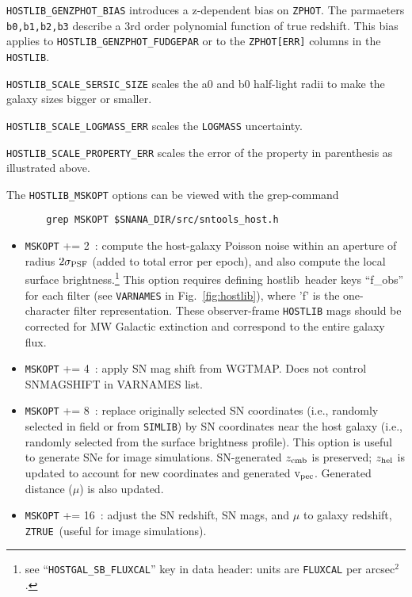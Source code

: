 \documentclass[12pt]{article}
\newcommand{\unc}{uncertainty}
\newcommand{\hostlib}{{\sc hostlib}}
\newcommand{\zhelio}{z_{\rm hel}}
\newcommand{\zcmb}{z_{\rm cmb}}
\newcommand{\vpec}{{\rm v}_{\rm pec}}
\newcommand{\ztrue}{{\tt ZTRUE}}
\begin{document}
{{\tt HOSTLIB\_GENZPHOT\_BIAS} introduces a z-dependent bias on {\tt ZPHOT}.
The parmaeters {\tt b0,b1,b2,b3} describe a 3rd order polynomial function
of true redshift. This bias applies to {\tt HOSTLIB\_GENZPHOT\_FUDGEPAR} 
or to the {\tt ZPHOT[ERR]} columns in the {\tt HOSTLIB}.

{\tt HOSTLIB\_SCALE\_SERSIC\_SIZE} scales the a0 and b0 half-light radii
to make the galaxy sizes bigger or smaller.

{\tt HOSTLIB\_SCALE\_LOGMASS\_ERR} scales the {\tt LOGMASS} \unc.

{\tt HOSTLIB\_SCALE\_PROPERTY\_ERR} scales the error of the property in parenthesis as illustrated above.

The {\tt HOSTLIB\_MSKOPT} options can be 
viewed with the grep-command
\begin{verbatim}
       grep MSKOPT $SNANA_DIR/src/sntools_host.h 
\end{verbatim}
%
\begin{itemize}
\item {\tt MSKOPT} += 2~: compute the host-galaxy Poisson noise within
       an aperture of radius $2\sigma_{\rm PSF}$ 
       (added to total error per epoch), and also compute
       the local surface brightness.\footnote{see 
         ``{\tt HOSTGAL\_SB\_FLUXCAL}'' key in data header: 
         units are {\tt FLUXCAL} per arcsec$^2$.}
       This option requires defining \hostlib\ header keys
       ``f\_obs'' for each filter 
       (see {\tt VARNAMES} in Fig.~\ref{fig:hostlib}), 
       where 'f' is the one-character filter representation.
       These observer-frame {\tt HOSTLIB} mags should be corrected for 
       MW Galactic extinction and correspond to the entire galaxy flux.
%
\item {\tt MSKOPT} += 4~: apply SN mag shift from WGTMAP.
      Does not control SNMAGSHIFT in VARNAMES list.
%
\item {\tt MSKOPT} += 8~: replace originally selected SN coordinates 
      (i.e., randomly selected in field or from {\tt SIMLIB})
      by SN coordinates near the host galaxy 
      (i.e., randomly selected from the surface brightness profile).
      This option is useful to generate SNe for image simulations.
      SN-generated $\zcmb$ is preserved; $\zhelio$ is updated to
      account for new coordinates and generated $\vpec$. 
      Generated distance ($\mu$) is also updated.
%
\item {\tt MSKOPT} += 16~: adjust the SN redshift, SN mags, and $\mu$ 
      to galaxy redshift, \ztrue\  (useful for image simulations).

\end{itemize}}
\end{document}
